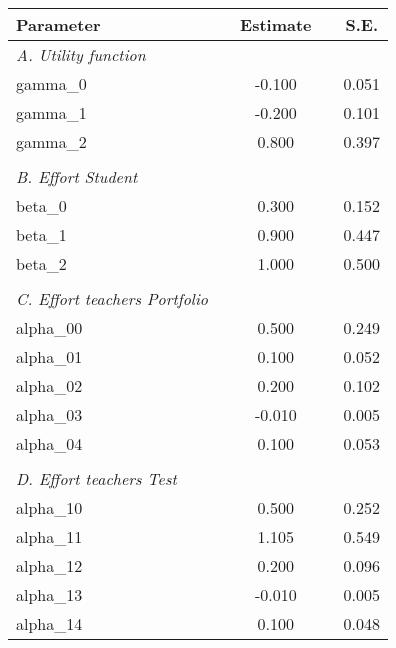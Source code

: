 \begin{tabular}{lcccc}
\hline
Parameter &  & Estimate & & S.E. \bigstrut\\
\hline
\emph{A. Utility function} &       &       &       &  \\
gamma_0 &  &  -0.100 &  & 0.051 \\
gamma_1 &  &  -0.200 &  & 0.101 \\
gamma_2 &  &  0.800 &  & 0.397 \\
 &       &       &       &  \\
\emph{B. Effort Student} &       &       &       &  \\
beta_0 &  &  0.300 &  & 0.152 \\
beta_1 &  &  0.900 &  & 0.447 \\
beta_2 &  &  1.000 &  & 0.500 \\
 &       &       &       &  \\
\emph{C. Effort teachers Portfolio} &       &       &       &  \\
alpha_00 &  &  0.500 &  & 0.249 \\
alpha_01 &  &  0.100 &  & 0.052 \\
alpha_02 &  &  0.200 &  & 0.102 \\
alpha_03 &  &  -0.010 &  & 0.005 \\
alpha_04 &  &  0.100 &  & 0.053 \\
 &       &       &       &  \\
\emph{D. Effort teachers Test} &       &       &       &  \\
alpha_10 &  &  0.500 &  & 0.252 \\
alpha_11 &  &  1.105 &  & 0.549 \\
alpha_12 &  &  0.200 &  & 0.096 \\
alpha_13 &  &  -0.010 &  & 0.005 \\
alpha_14 &  &  0.100 &  & 0.048 \\
\hline
\end{tabular}
